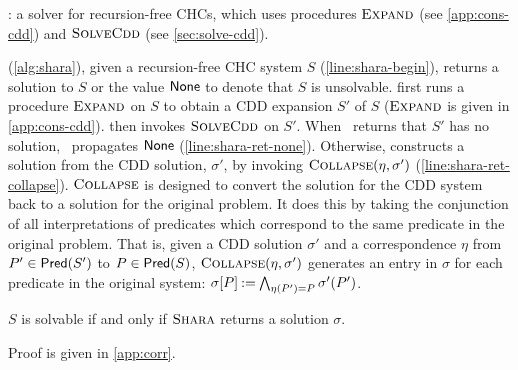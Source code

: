 \begin{algorithm}[t]
  \caption{\sys: a solver for recursion-free CHCs, which uses
    procedures $\textsc{Expand}{}$ (see \autoref{app:cons-cdd}) and
    $\textsc{SolveCdd}$ (see
    \autoref{sec:solve-cdd}). }
  \label{alg:shara}
\end{algorithm}
\sys (\autoref{alg:shara}), given a recursion-free CHC system $S$
(\autoref{line:shara-begin}), 
returns a solution
to $S$ or the value $\mathsf{None}$ to denote that $S$ is
unsolvable.
%
\sys first runs a procedure $\textsc{Expand}$ on $S$ to obtain a CDD expansion
$S'$ of $S$ ($\textsc{Expand}$ is given in \autoref{app:cons-cdd}).
%
\sys then invokes $\textsc{SolveCdd}$ on $S'$.
%
When \solvecdd~returns that $S'$ has
no solution, \sys~propagates $\mathsf{None}$ (\autoref{line:shara-ret-none}).
%
Otherwise, \sys constructs a solution from the CDD solution,
$\sigma'$, by invoking $\textsc{Collapse}( \eta ,  \sigma' )$
(\autoref{line:shara-ret-collapse}).
%
$\textsc{Collapse}$ is designed to convert the solution for the CDD system
back to a solution for the original problem. It does this by
taking the conjunction of all interpretations of predicates which
correspond to the same predicate in the original problem.
%
That is, given a CDD solution $\sigma'$ and a correspondence $\eta$ from
$P' \in \mathsf{Pred}( S' )$ to $P \in \mathsf{Pred}( S )$,
$\textsc{Collapse}(\eta, \sigma')$ generates an entry in $\sigma$ for each
predicate in the original system:
$\sigma[P] \mathbin{:=} \bigwedge_{ \eta(P') = P} \sigma'(P')$.

\begin{thm}
  \label{thm:corr}
  $S$ is solvable if and only if $\textsc{Shara}$ returns a solution $\sigma$.
\end{thm}
Proof is given in \autoref{app:corr}.

